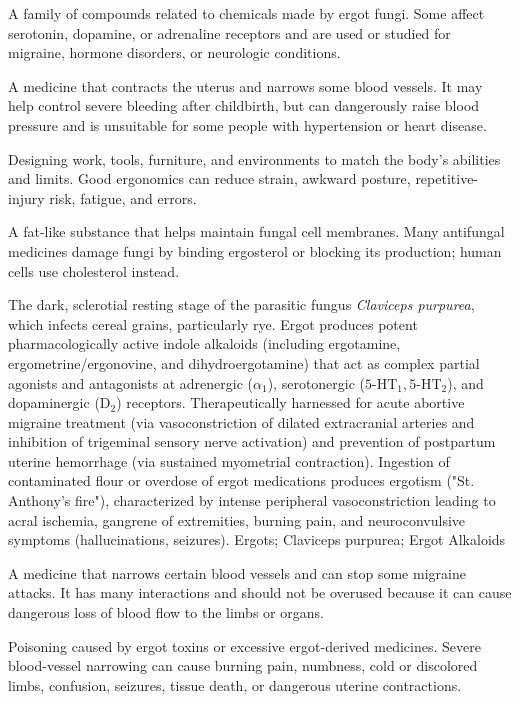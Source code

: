  A family of compounds related to chemicals made by ergot fungi. Some affect serotonin, dopamine, or adrenaline receptors and are used or studied for migraine, hormone disorders, or neurologic conditions.

 A medicine that contracts the uterus and narrows some blood vessels. It may help control severe bleeding after childbirth, but can dangerously raise blood pressure and is unsuitable for some people with hypertension or heart disease.

 Designing work, tools, furniture, and environments to match the body’s abilities and limits. Good ergonomics can reduce strain, awkward posture, repetitive-injury risk, fatigue, and errors.

 A fat-like substance that helps maintain fungal cell membranes. Many antifungal medicines damage fungi by binding ergosterol or blocking its production; human cells use cholesterol instead.

 The dark, sclerotial resting stage of the parasitic fungus \textit{Claviceps purpurea}, which infects cereal grains, particularly rye. Ergot produces potent pharmacologically active indole alkaloids (including ergotamine, ergometrine/ergonovine, and dihydroergotamine) that act as complex partial agonists and antagonists at adrenergic ($\alpha_1$), serotonergic ($5\text{-HT}_1, 5\text{-HT}_2$), and dopaminergic ($\text{D}_2$) receptors. Therapeutically harnessed for acute abortive migraine treatment (via vasoconstriction of dilated extracranial arteries and inhibition of trigeminal sensory nerve activation) and prevention of postpartum uterine hemorrhage (via sustained myometrial contraction). Ingestion of contaminated flour or overdose of ergot medications produces ergotism ("St. Anthony's fire"), characterized by intense peripheral vasoconstriction leading to acral ischemia, gangrene of extremities, burning pain, and neuroconvulsive symptoms (hallucinations, seizures).
\synonyms
Ergots; Claviceps purpurea; Ergot Alkaloids

 A medicine that narrows certain blood vessels and can stop some migraine attacks. It has many interactions and should not be overused because it can cause dangerous loss of blood flow to the limbs or organs.

 Poisoning caused by ergot toxins or excessive ergot-derived medicines. Severe blood-vessel narrowing can cause burning pain, numbness, cold or discolored limbs, confusion, seizures, tissue death, or dangerous uterine contractions.

